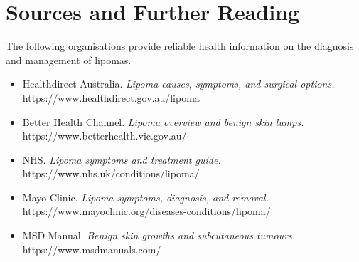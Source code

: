 \section*{Sources and Further Reading}
The following organisations provide reliable health information on the diagnosis and management of lipomas.

\begin{itemize}
    \item Healthdirect Australia. \textit{Lipoma causes, symptoms, and surgical options.} https://www.healthdirect.gov.au/lipoma
    \item Better Health Channel. \textit{Lipoma overview and benign skin lumps.} https://www.betterhealth.vic.gov.au/
    \item NHS. \textit{Lipoma symptoms and treatment guide.} https://www.nhs.uk/conditions/lipoma/
    \item Mayo Clinic. \textit{Lipoma symptoms, diagnosis, and removal.} https://www.mayoclinic.org/diseases-conditions/lipoma/
    \item MSD Manual. \textit{Benign skin growths and subcutaneous tumours.} https://www.msdmanuals.com/
\end{itemize}
